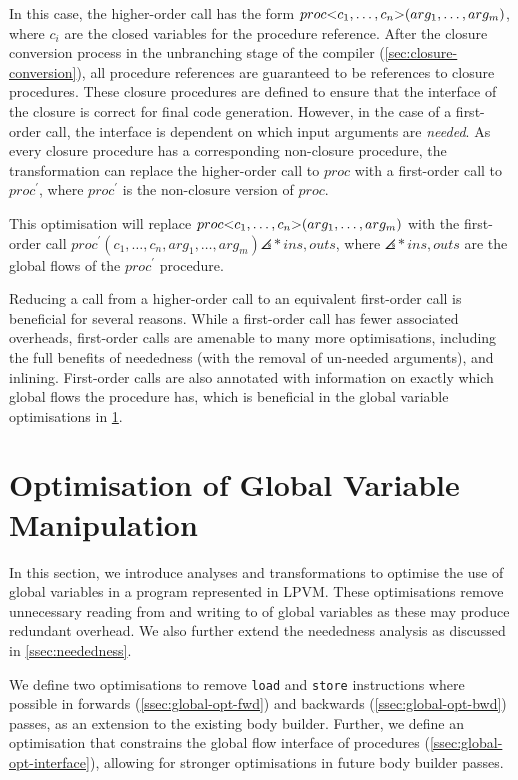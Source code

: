 In this case, the higher-order call has the form $proc\mathtt{<}c_1, \dots, c_n\mathtt{>}(arg_1, \dots, arg_m)$, where $c_i$ are the closed variables for the procedure reference. After the closure conversion process in the unbranching stage of the compiler (\cref{sec:closure-conversion}), all procedure references are guaranteed to be references to closure procedures. These closure procedures are defined to ensure that the interface of the closure is correct for final code generation. However, in the case of a first-order call, the interface is dependent on which input arguments are \textit{needed}. As every closure procedure has a corresponding non-closure procedure, the transformation can replace the higher-order call to $proc$ with a first-order call to $proc^\prime$, where $proc^\prime$ is the non-closure version of $proc$. 

This optimisation will replace $proc\mathtt{<}c_1, \dots, c_n\mathtt{>}(arg_1, \dots, arg_m)$ with the first-order call $proc^\prime(c_1, \dots, c_n, arg_1, \dots, arg_m)\angles*{ins, outs}$, where $\angles*{ins, outs}$ are the global flows of the $proc^\prime$ procedure.

Reducing a call from a higher-order call to an equivalent first-order call is beneficial for several reasons. While a first-order call has fewer associated overheads, first-order calls are amenable to many more optimisations, including the full benefits of neededness (with the removal of un-needed arguments), and inlining. First-order calls are also annotated with information on exactly which global flows the procedure has, which is beneficial in the global variable optimisations in \cref{sec:global-opt}.

\section{Optimisation of Global Variable Manipulation}
\label{sec:global-opt}

In this section, we introduce analyses and transformations to optimise the use of global variables in a program represented in LPVM. These optimisations remove unnecessary reading from and writing to of global variables as these may produce redundant overhead. We also further extend the neededness analysis as discussed in \cref{ssec:neededness}.

We define two optimisations to remove \texttt{load} and \texttt{store} instructions where possible in forwards (\cref{ssec:global-opt-fwd}) and backwards (\cref{ssec:global-opt-bwd}) passes, as an extension to the existing body builder. Further, we define an optimisation that constrains the global flow interface of procedures (\cref{ssec:global-opt-interface}), allowing for stronger optimisations in future body builder passes.

